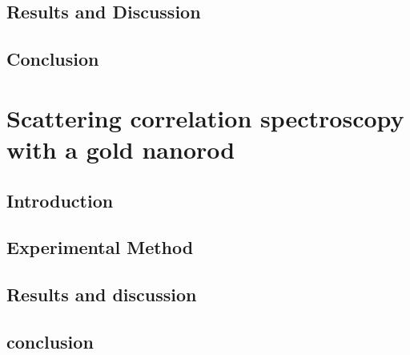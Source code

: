 \section{Results and Discussion}
\section{Conclusion}

\chapter{Scattering correlation spectroscopy with a gold nanorod}
\section{Introduction}
\section{Experimental Method}
\section{Results and discussion}
\section{conclusion}